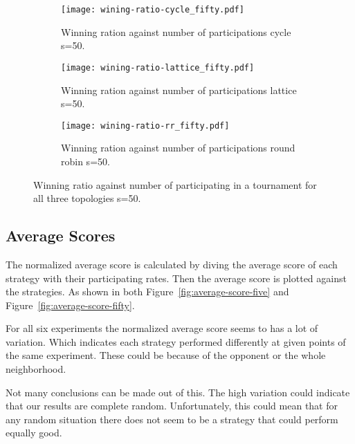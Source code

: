 \begin{figure}[H]
\centering
    \begin{subfigure}[t]{1\textwidth}
    \centering
        \texttt{[image: wining-ratio-cycle\_fifty.pdf]}
    \caption{Winning ration against number of participations cycle s=50.}
    \end{subfigure}
\hfill
    \begin{subfigure}[t]{1\textwidth}\centering
    \centering
        \texttt{[image: wining-ratio-lattice\_fifty.pdf]}
    \caption{Winning ration against number of participations lattice s=50.}
    \end{subfigure}
\hfill
    \begin{subfigure}[t]{1\textwidth}\centering
    \centering
        \texttt{[image: wining-ratio-rr\_fifty.pdf]}
    \caption{Winning ration against number of participations round robin s=50.}
    \end{subfigure}
\caption{Winning ratio against number of participating in a tournament
             for all three topologies s=50.}
\label{fig:winning-ratio-fifty}
\end{figure}

\subsection{Average Scores}

The normalized average score is calculated by diving the average score
of each strategy with their participating rates. Then the average score
is plotted against the strategies. As shown in both Figure~\ref{fig:average-score-five}
and Figure~\ref{fig:average-score-fifty}.

For all six experiments the normalized average score seems to has a lot
of variation. Which indicates each strategy performed differently at given
points of the same experiment. These could be because of the opponent or the
whole neighborhood.

Not many conclusions can be made out of this. The high variation could indicate
that our results are complete random.  Unfortunately, this could mean that for
any random situation there does not seem to be a strategy that could
perform equally good.

